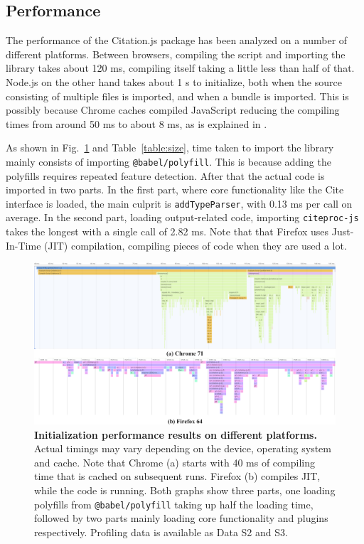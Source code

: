 \documentclass[fleqn,10pt,lineno]{wlpeerj} %
\begin{document}
\subsection*{Performance}

The performance of the Citation.js package has been analyzed on a number of different platforms. Between browsers, compiling the script and importing the library takes about 120 ms, compiling itself taking a little less than half of that. Node.js on the other hand takes about 1 s to initialize, both when the source consisting of multiple files is imported, and when a bundle is imported. This is possibly because Chrome caches compiled JavaScript reducing the compiling times from around 50 ms to about 8 ms, as is explained in \cite{alle_improved_2018}.

As shown in Fig.~\ref{fig:perf} and Table~\ref{table:size}, time taken to import the library mainly consists of importing \texttt{@babel/polyfill}. This is because adding the polyfills requires repeated feature detection. After that the actual code is imported in two parts. In the first part, where core functionality like the Cite interface is loaded, the main culprit is \texttt{addTypeParser}, with 0.13 ms per call on average. In the second part, loading output-related code, importing \texttt{citeproc-js} takes the longest with a single call of 2.82 ms.
Note that that Firefox uses Just-In-Time (JIT) compilation, compiling pieces of code when they are used a lot.

\begin{figure}[bt!]
\includegraphics[width=\linewidth]{figures/Figure_6.png}
\caption{\textbf{Initialization performance results on different platforms.}
Actual timings may vary depending on the device, operating system and cache. Note that Chrome (a) starts with 40 ms of compiling time that is cached on subsequent runs. Firefox (b) compiles JIT, while the code is running. Both graphs show three parts, one loading polyfills from \texttt{@babel/polyfill} taking up half the loading time, followed by two parts mainly loading core functionality and plugins respectively. Profiling data is available as Data S2 and S3.}
\label{fig:perf}
\end{figure}
\end{document}
